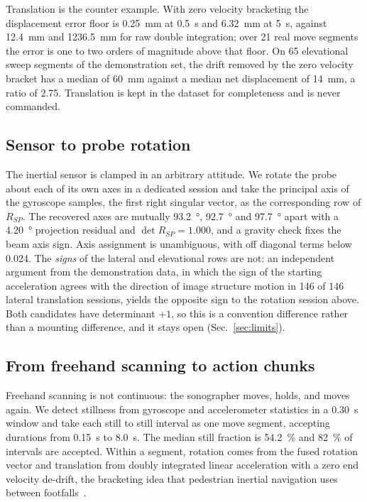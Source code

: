 \documentclass[conference]{IEEEtran}
\begin{document}
Translation is the counter example. With zero velocity bracketing the
displacement error floor is \SI{0.25}{\milli\metre} at \SI{0.5}{\second} and
\SI{6.32}{\milli\metre} at \SI{5}{\second}, against \SI{12.4}{\milli\metre} and
\SI{1236.5}{\milli\metre} for raw double integration; over 21 real move
segments the error is one to two orders of magnitude above that floor. On 65
elevational sweep segments of the demonstration set, the drift removed by the
zero velocity bracket has a median of \SI{60}{\milli\metre} against a median
net displacement of \SI{14}{\milli\metre}, a ratio of \num{2.75}. Translation
is kept in the dataset for completeness and is never commanded.

\subsection{Sensor to probe rotation}

The inertial sensor is clamped in an arbitrary attitude. We rotate the probe
about each of its own axes in a dedicated session and take the principal axis of
the gyroscope samples, the first right singular vector, as the corresponding row
of $R_{SP}$. The recovered axes are mutually \SI{93.2}{\degree},
\SI{92.7}{\degree} and \SI{97.7}{\degree} apart with a \SI{4.20}{\degree}
projection residual and $\det R_{SP} = \num{+1.000}$, and a gravity check fixes
the beam axis sign. Axis assignment is unambiguous, with off diagonal terms
below \num{0.024}. The \emph{signs} of the lateral and elevational rows are
not: an independent argument from the demonstration data, in which the sign of
the starting acceleration agrees with the direction of image structure motion in
146 of 146 lateral translation sessions, yields the opposite sign to the
rotation session above. Both candidates have determinant $+1$, so this is a
convention difference rather than a mounting difference, and it stays open
(Sec.~\ref{sec:limits}).

\subsection{From freehand scanning to action chunks}

Freehand scanning is not continuous: the sonographer moves, holds, and moves
again. We detect stillness from gyroscope and accelerometer statistics in a
\SI{0.30}{\second} window and take each still to still interval as one move
segment, accepting durations from \SI{0.15}{\second} to \SI{8.0}{\second}. The
median still fraction is \SI{54.2}{\percent} and \SI{82}{\percent} of intervals
are accepted. Within a segment, rotation comes from the fused rotation vector
and translation from doubly integrated linear acceleration with a zero end
velocity de-drift, the bracketing idea that pedestrian inertial navigation uses
between footfalls~\cite{foxlin2005pedestrian,skog2010zerovelocity}.
\end{document}
